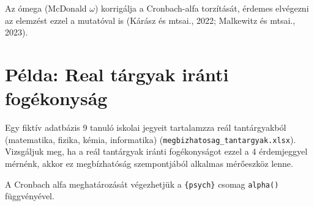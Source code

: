 \documentclass[
  letterpaper,
]{krantz}
\makeatletter
\newenvironment{Shaded}{\begin{snugshade}}{\end{snugshade}}
\newcommand{\AttributeTok}[1]{\textcolor[rgb]{0.40,0.45,0.13}{#1}}
\newcommand{\CommentTok}[1]{\textcolor[rgb]{0.37,0.37,0.37}{#1}}
\newcommand{\FunctionTok}[1]{\textcolor[rgb]{0.28,0.35,0.67}{#1}}
\newcommand{\NormalTok}[1]{\textcolor[rgb]{0.00,0.23,0.31}{#1}}
\newcommand{\OtherTok}[1]{\textcolor[rgb]{0.00,0.23,0.31}{#1}}
\newcommand{\SpecialCharTok}[1]{\textcolor[rgb]{0.37,0.37,0.37}{#1}}
\newcommand{\StringTok}[1]{\textcolor[rgb]{0.13,0.47,0.30}{#1}}
\newenvironment{kframe}{%
\medskip{}
\setlength{\fboxsep}{.8em}
 \def\at@end@of@kframe{}%
 \ifinner\ifhmode%
  \def\at@end@of@kframe{\end{minipage}}%
  \begin{minipage}{\columnwidth}%
 \fi\fi%
 \def\FrameCommand##1{\hskip\@totalleftmargin \hskip-\fboxsep
 \colorbox{shadecolor}{##1}\hskip-\fboxsep
     \hskip-\linewidth \hskip-\@totalleftmargin \hskip\columnwidth}%
 \MakeFramed {\advance\hsize-\width
   \@totalleftmargin\z@ \linewidth\hsize
   \@setminipage}}%
 {\par\unskip\endMakeFramed%
 \at@end@of@kframe}
\renewenvironment{Shaded}{\begin{kframe}}{\end{kframe}}
\makeatother
\begin{document}
Az ómega (McDonald \(\omega\)) korrigálja a Cronbach-alfa torzítását,
érdemes elvégezni az elemzést ezzel a mutatóval is (Kárász és mtsai.,
2022; Malkewitz és mtsai., 2023).

\hypertarget{puxe9lda-real-tuxe1rgyak-iruxe1nti-foguxe9konysuxe1g}{%
\section{Példa: Real tárgyak iránti
fogékonyság}\label{puxe9lda-real-tuxe1rgyak-iruxe1nti-foguxe9konysuxe1g}}

Egy fiktív adatbázis 9 tanuló iskolai jegyeit tartalamzza reál
tantárgyakból (matematika, fizika, kémia, informatika)
(\texttt{megbizhatosag\_tantargyak.xlsx}). Vizsgáljuk meg, ha a reál
tantárgyak iránti fogékonyságot ezzel a 4 érdemjeggyel mérnénk, akkor ez
megbízhatóság szempontjából alkalmas mérőeszköz lenne.

\begin{Shaded}
\end{Shaded}

A Cronbach alfa meghatározását végezhetjük a \texttt{\{psych\}} csomag
\texttt{alpha()} függvényével.
\end{document}
